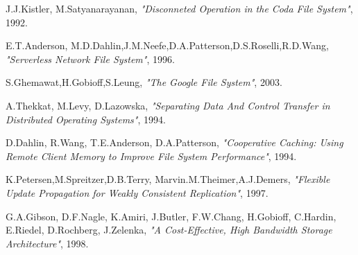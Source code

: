 {\begin{thebibliography}{21}
	 J.J.Kistler, M.Satyanarayanan, \textit{"Disconneted Operation in the Coda File System"}, 1992.
	
	 E.T.Anderson, M.D.Dahlin,J.M.Neefe,D.A.Patterson,D.S.Roselli,R.D.Wang, \textit{"Serverless Network File System"}, 1996.
	
	 S.Ghemawat,H.Gobioff,S.Leung, \textit{"The Google File System"}, 2003.
	
	 A.Thekkat, M.Levy, D.Lazowska, \textit{"Separating Data And Control Transfer in Distributed Operating Systems"}, 1994.
	
	 D.Dahlin, R.Wang, T.E.Anderson, D.A.Patterson, \textit{"Cooperative Caching: Using Remote Client Memory to Improve File System Performance"}, 1994.
	
	 K.Petersen,M.Spreitzer,D.B.Terry, Marvin.M.Theimer,A.J.Demers, \textit{"Flexible Update Propagation for Weakly Consistent Replication"}, 1997.
	
	 G.A.Gibson, D.F.Nagle, K.Amiri, J.Butler, F.W.Chang, H.Gobioff, C.Hardin, E.Riedel, D.Rochberg, J.Zelenka, \textit{"A Cost-Effective, High Bandwidth Storage Architecture"}, 1998.
	
\end{thebibliography}
}
